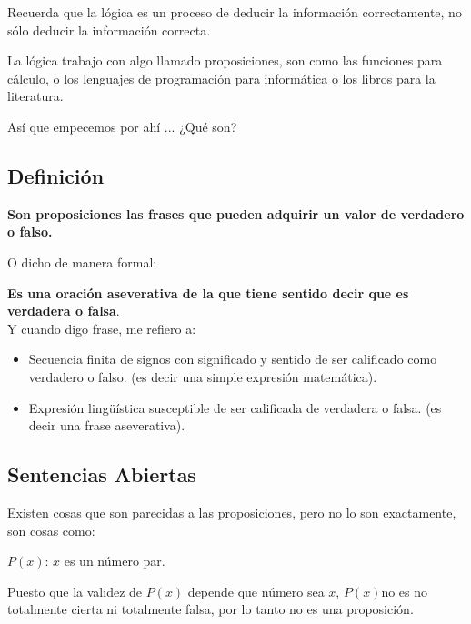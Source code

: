 \documentclass[12pt]{report}                                    %
\begin{document}
        Recuerda que la lógica es un proceso de deducir la información correctamente,
        no sólo deducir la información correcta.

        La lógica trabajo con algo llamado proposiciones, son como las funciones para
        cálculo, o los lenguajes de programación para informática o los libros para la literatura.

        Así que empecemos por ahí ... ¿Qué son?


        \subsection*{Definición}
            
            \textbf{Son proposiciones las frases que pueden adquirir un valor de verdadero o falso.}
            
            O dicho de manera formal:

            \textbf{Es una oración aseverativa de la que tiene sentido decir que es verdadera o falsa}.\\

            Y cuando digo frase, me refiero a:
            \begin{itemize}
                \item Secuencia finita de signos con significado y sentido de ser calificado como verdadero o falso.
                        (es decir una simple expresión matemática).

                \item Expresión lingüística susceptible de ser calificada de verdadera o falsa.
                        (es decir una frase aseverativa).
            \end{itemize}


        \subsection*{Sentencias Abiertas}
            Existen cosas que son parecidas a las proposiciones, pero no lo son exactamente, son cosas como:

            $P(x)$: $x$ es un número par.

            Puesto que la validez de $P(x)$ depende que número sea $x$, $P(x)$no es no totalmente cierta ni
            totalmente falsa, por lo tanto no es una proposición.
\end{document}
